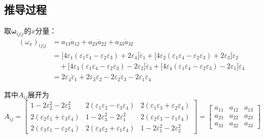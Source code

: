 \subsection*{推导过程}

取$\boldsymbol{\omega}_{ij|j}$的$x$分量：
\begin{align}
(\omega_x)_{ij|j} &= a_{13}\dot{a}_{12} + a_{23}\dot{a}_{22} + a_{33}\dot{a}_{32} \nonumber\\
&= \bigl[4\varepsilon_1(\varepsilon_1\varepsilon_4 - \varepsilon_2\varepsilon_3) + 2\varepsilon_4\bigr]\dot{\varepsilon}_1
   + \bigl[4\varepsilon_2(\varepsilon_1\varepsilon_4 - \varepsilon_2\varepsilon_3) + 2\varepsilon_3\bigr]\dot{\varepsilon}_2 \nonumber\\
&\quad + \bigl[4\varepsilon_3(\varepsilon_1\varepsilon_4 - \varepsilon_2\varepsilon_3) - 2\varepsilon_2\bigr]\dot{\varepsilon}_3
   + \bigl[4\varepsilon_4(\varepsilon_1\varepsilon_4 - \varepsilon_2\varepsilon_3) - 2\varepsilon_1\bigr]\dot{\varepsilon}_4 \nonumber\\
&= 2\varepsilon_4\dot{\varepsilon}_1 + 2\varepsilon_3\dot{\varepsilon}_2 - 2\varepsilon_2\dot{\varepsilon}_3 - 2\varepsilon_1\dot{\varepsilon}_4
\end{align}

其中$A_{ij}$展开为
\begin{equation}
A_{ij} =
\begin{bmatrix}
1 - 2\varepsilon_2^2 - 2\varepsilon_3^2 & 2(\varepsilon_1\varepsilon_2 - \varepsilon_3\varepsilon_4) & 2(\varepsilon_1\varepsilon_3 + \varepsilon_2\varepsilon_4) \\[4pt]
2(\varepsilon_2\varepsilon_1 + \varepsilon_3\varepsilon_4) & 1 - 2\varepsilon_3^2 - 2\varepsilon_1^2 & 2(\varepsilon_2\varepsilon_3 - \varepsilon_1\varepsilon_4) \\[4pt]
2(\varepsilon_3\varepsilon_1 - \varepsilon_2\varepsilon_4) & 2(\varepsilon_3\varepsilon_2 + \varepsilon_1\varepsilon_4) & 1 - 2\varepsilon_1^2 - 2\varepsilon_2^2
\end{bmatrix}
=
\begin{bmatrix}
a_{11} & a_{12} & a_{13} \\ a_{21} & a_{22} & a_{23} \\ a_{31} & a_{32} & a_{33}
\end{bmatrix}
\end{equation}

